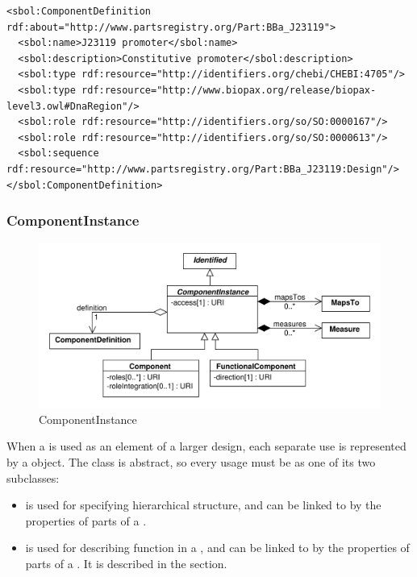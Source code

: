 \begin{lstlisting}
<sbol:ComponentDefinition rdf:about="http://www.partsregistry.org/Part:BBa_J23119">
  <sbol:name>J23119 promoter</sbol:name>
  <sbol:description>Constitutive promoter</sbol:description>
  <sbol:type rdf:resource="http://identifiers.org/chebi/CHEBI:4705"/>
  <sbol:type rdf:resource="http://www.biopax.org/release/biopax-level3.owl#DnaRegion"/>
  <sbol:role rdf:resource="http://identifiers.org/so/SO:0000167"/>
  <sbol:role rdf:resource="http://identifiers.org/so/SO:0000613"/>
  <sbol:sequence rdf:resource="http://www.partsregistry.org/Part:BBa_J23119:Design"/>
</sbol:ComponentDefinition>
\end{lstlisting}


\subsubsection{ComponentInstance}
\label{sec:ComponentInstance}

\begin{figure}[ht]
\begin{center}
\includegraphics[scale=0.6]{uml/component_instance}
\caption[]{ComponentInstance}
\label{uml:component}
\end{center}
\end{figure}

When a  is used as an element of a larger design, each separate use is represented by a  object.  
The  class is abstract, so every usage must be as one of its two subclasses:
\begin{itemize}
\item {} is used for specifying hierarchical structure, and can be linked to by the properties of parts of a .
\item {} is used for describing function in a , and can be linked to by the properties of parts of a .  It is described in the  section.
\end{itemize}

